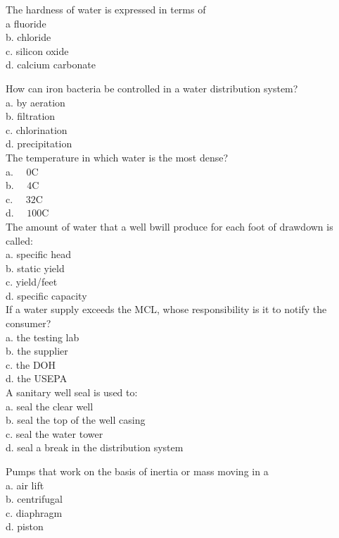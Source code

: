 The hardness of water is expressed in terms of\\
a fluoride\\
b. chloride\\
c. silicon oxide\\
d. calcium carbonate 

How can iron bacteria be controlled in a water distribution system?\\
a. by aeration\\
b. filtration\\
c. chlorination\\
d. precipitation\\

The temperature in which water is the most dense?\\
a. $\quad 0 \mathrm{C}$\\
b. $\quad 4 \mathrm{C}$\\
c. $\quad 32 \mathrm{C}$\\
d. $\quad 100 \mathrm{C}$\\

The amount of water that a well bwill produce for each foot of drawdown is called:\\
a. specific head\\
b. static yield\\
c. yield/feet\\
d. specific capacity\\

If a water supply exceeds the $\mathrm{MCL}$, whose responsibility is it to notify the consumer?\\
a. the testing lab\\
b. the supplier\\
c. the $\mathrm{DOH}$\\
d. the USEPA\\

A sanitary well seal is used to:\\
a. seal the clear well\\
b. seal the top of the well casing\\
c. seal the water tower\\
d. seal a break in the distribution system 

Pumps that work on the basis of inertia or mass moving in a\\
a. air lift\\
b. centrifugal\\
c. diaphragm\\
d. piston\\

